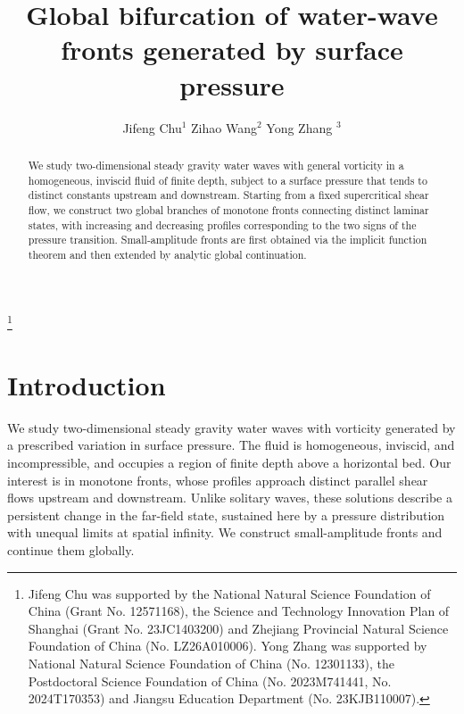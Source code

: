 \documentclass[12pt,letterpaper]{amsart}
\numberwithin{equation}{section}
\begin{document}
\title[Fronts generated by surface pressure]
{Global bifurcation of  water-wave fronts generated by surface pressure}

\author[]{Jifeng Chu$^{1}$ \quad Zihao Wang$^2$ \quad Yong Zhang $^3$}

\address{$^1$  School of Mathematical, Hangzhou Normal University, Hangzhou 311121, China}
\address{$^2$  Department of Mathematics, Shanghai Normal University, Shanghai 200234, China}
\address{$^3$  School of Mathematical Sciences, Jiangsu University, Zhenjiang 212013, China}


\thanks{Jifeng Chu was supported by the National Natural Science Foundation of China (Grant
No. 12571168), the Science and Technology Innovation Plan of Shanghai (Grant No. 23JC1403200) and
Zhejiang Provincial Natural Science Foundation of China (No. LZ26A010006). Yong Zhang was supported by National Natural Science Foundation of China (No. 12301133), the Postdoctoral Science Foundation of China (No. 2023M741441, No. 2024T170353) and Jiangsu Education Department (No.
23KJB110007).}


\begin{abstract}
We study two-dimensional steady gravity water waves with general vorticity in a homogeneous, inviscid fluid of finite depth, subject to a surface pressure that tends to distinct constants upstream and downstream. Starting from a fixed supercritical shear flow, we construct two global branches of monotone fronts connecting distinct laminar states, with increasing and decreasing profiles corresponding to the two signs of the pressure transition. Small-amplitude fronts are first obtained via the implicit function theorem and then extended by analytic global continuation.
\end{abstract}

\maketitle


\section{Introduction}

We study two-dimensional steady gravity water waves with vorticity generated by a prescribed variation in surface pressure. The fluid is homogeneous, inviscid, and incompressible, and occupies a region of finite depth above a horizontal bed. Our interest is in monotone fronts, whose profiles approach distinct parallel shear flows upstream and downstream. Unlike solitary waves, these solutions describe a persistent change in the far-field state, sustained here by a pressure distribution with unequal limits at spatial infinity. We construct small-amplitude fronts and continue them globally.
\end{document}
